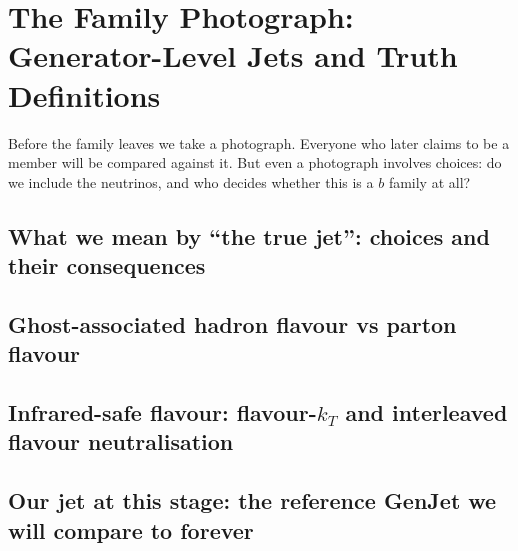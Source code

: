 \chapter{The Family Photograph: Generator-Level Jets and Truth Definitions}
\label{ch:family_photograph}

\begin{journeybox}
Before the family leaves we take a photograph. Everyone who later claims to be a
member will be compared against it. But even a photograph involves choices: do
we include the neutrinos, and who decides whether this is a $b$ family at all?
\end{journeybox}


\section{What we mean by ``the true jet'': choices and their consequences}
\label{sec:family_photograph:what_we_mean_by_the_true_jet_choices_and}

\section{Ghost-associated hadron flavour vs parton flavour}
\label{sec:family_photograph:ghost_associated_hadron_flavour_vs_parto}

\section{Infrared-safe flavour: flavour-$k_T$ and interleaved flavour neutralisation}
\label{sec:family_photograph:infrared_safe_flavour_flavour_k_t_and_in}

\section{Our jet at this stage: the reference GenJet we will compare to forever}
\label{sec:family_photograph:our_jet_at_this_stage_the_reference_genj}

